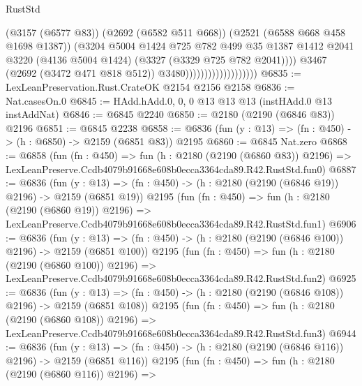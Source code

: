 \begin{lexlean}{RustStd}
\begin{coremodule}
                                            (@3157 (@6577 @83))
                                            (@2692 (@6582 @511 @668))
                                            (@2521 (@6588 @668 @458 @1698 @1387))
                                            (@3204
                                              @5004
                                              @1424
                                              @725
                                              @782
                                              @499
                                              @35
                                              @1387
                                              @1412
                                              @2041
                                              @3220
                                              (@4136 @5004 @1424)
                                              (@3327 (@3329 @725 @782 @2041))))
                                          @3467
                                          (@2692 (@3472 @471 @818 @512))
                                          @3480)))))))))))))))))))
@6835 := LexLeanPreservation.Rust.CrateOK @2154 @2156 @2158
@6836 := Nat.casesOn.{0}
@6845 := HAdd.hAdd.{0, 0, 0} @13 @13 @13 (instHAdd.{0} @13 instAddNat)
@6846 := @6845 @2240
@6850 := @2180 (@2190 (@6846 @83)) @2196
@6851 := @6845 @2238
@6858 := @6836 (fun (y : @13) => (fn : @450) -> (h : @6850) -> @2159 (@6851 @83)) @2195
@6860 := @6845 Nat.zero
@6868 := @6858
    (fun (fn : @450) =>
    fun (h : @2180 (@2190 (@6860 @83)) @2196) =>
    LexLeanPreserve.Ccdb4079b91668e608b0ecca3364cda89.R42.RustStd.fun0)
@6887 := @6836
    (fun (y : @13) => (fn : @450) -> (h : @2180 (@2190 (@6846 @19)) @2196) -> @2159 (@6851 @19))
    @2195
    (fun (fn : @450) =>
    fun (h : @2180 (@2190 (@6860 @19)) @2196) =>
    LexLeanPreserve.Ccdb4079b91668e608b0ecca3364cda89.R42.RustStd.fun1)
@6906 := @6836
    (fun (y : @13) => (fn : @450) -> (h : @2180 (@2190 (@6846 @100)) @2196) -> @2159 (@6851 @100))
    @2195
    (fun (fn : @450) =>
    fun (h : @2180 (@2190 (@6860 @100)) @2196) =>
    LexLeanPreserve.Ccdb4079b91668e608b0ecca3364cda89.R42.RustStd.fun2)
@6925 := @6836
    (fun (y : @13) => (fn : @450) -> (h : @2180 (@2190 (@6846 @108)) @2196) -> @2159 (@6851 @108))
    @2195
    (fun (fn : @450) =>
    fun (h : @2180 (@2190 (@6860 @108)) @2196) =>
    LexLeanPreserve.Ccdb4079b91668e608b0ecca3364cda89.R42.RustStd.fun3)
@6944 := @6836
    (fun (y : @13) => (fn : @450) -> (h : @2180 (@2190 (@6846 @116)) @2196) -> @2159 (@6851 @116))
    @2195
    (fun (fn : @450) =>
    fun (h : @2180 (@2190 (@6860 @116)) @2196) =>

\end{coremodule}
\end{lexlean}
